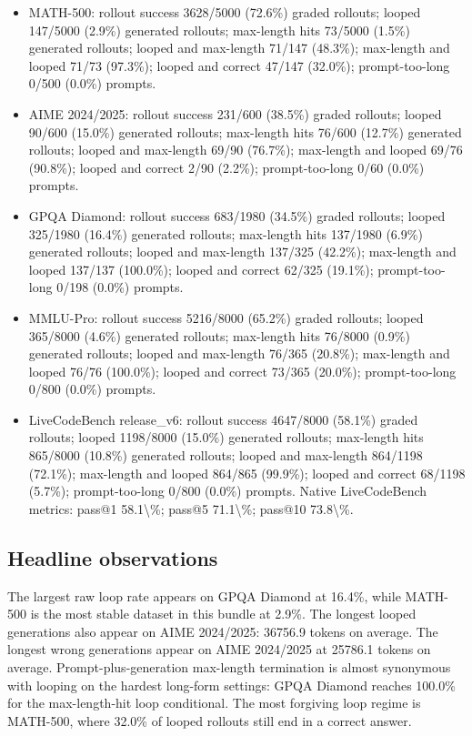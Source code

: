 \documentclass[11pt]{article}
\begin{document}
\begin{itemize}[leftmargin=1.5em]
\item MATH-500: rollout success 3628/5000 (72.6\%) graded rollouts; looped 147/5000 (2.9\%) generated rollouts; max-length hits 73/5000 (1.5\%) generated rollouts; looped and max-length 71/147 (48.3\%); max-length and looped 71/73 (97.3\%); looped and correct 47/147 (32.0\%); prompt-too-long 0/500 (0.0\%) prompts.
\item AIME 2024/2025: rollout success 231/600 (38.5\%) graded rollouts; looped 90/600 (15.0\%) generated rollouts; max-length hits 76/600 (12.7\%) generated rollouts; looped and max-length 69/90 (76.7\%); max-length and looped 69/76 (90.8\%); looped and correct 2/90 (2.2\%); prompt-too-long 0/60 (0.0\%) prompts.
\item GPQA Diamond: rollout success 683/1980 (34.5\%) graded rollouts; looped 325/1980 (16.4\%) generated rollouts; max-length hits 137/1980 (6.9\%) generated rollouts; looped and max-length 137/325 (42.2\%); max-length and looped 137/137 (100.0\%); looped and correct 62/325 (19.1\%); prompt-too-long 0/198 (0.0\%) prompts.
\item MMLU-Pro: rollout success 5216/8000 (65.2\%) graded rollouts; looped 365/8000 (4.6\%) generated rollouts; max-length hits 76/8000 (0.9\%) generated rollouts; looped and max-length 76/365 (20.8\%); max-length and looped 76/76 (100.0\%); looped and correct 73/365 (20.0\%); prompt-too-long 0/800 (0.0\%) prompts.
\item LiveCodeBench release\_v6: rollout success 4647/8000 (58.1\%) graded rollouts; looped 1198/8000 (15.0\%) generated rollouts; max-length hits 865/8000 (10.8\%) generated rollouts; looped and max-length 864/1198 (72.1\%); max-length and looped 864/865 (99.9\%); looped and correct 68/1198 (5.7\%); prompt-too-long 0/800 (0.0\%) prompts. Native LiveCodeBench metrics: pass@1 58.1\textbackslash{}\%; pass@5 71.1\textbackslash{}\%; pass@10 73.8\textbackslash{}\%.
\end{itemize}

\subsection*{Headline observations}
The largest raw loop rate appears on GPQA Diamond at 16.4\%, while MATH-500 is the most stable dataset in this bundle at 2.9\%.
The longest looped generations also appear on AIME 2024/2025: 36756.9 tokens on average. The longest wrong generations appear on AIME 2024/2025 at 25786.1 tokens on average.
Prompt-plus-generation max-length termination is almost synonymous with looping on the hardest long-form settings: GPQA Diamond reaches 100.0\% for the max-length-hit loop conditional.
The most forgiving loop regime is MATH-500, where 32.0\% of looped rollouts still end in a correct answer.
\end{document}
